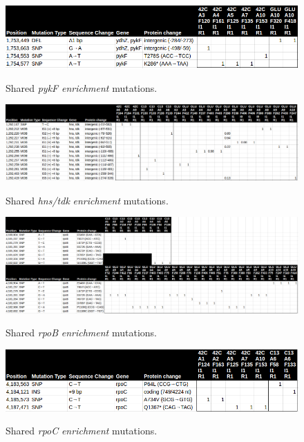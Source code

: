 \documentclass[12pt,final,masters,chapterheads]{ucsd}  %
\begin{document}
\begin{figure}[h!]
  \caption{Shared \textit{pykF} \textit{enrichment} mutations.}
  \centering
  \includegraphics[width=\textwidth]{pykF_shared_enrich_mut.png}
  \label{fig:pykF_shared_enrich_mut}
\end{figure}

\begin{figure}[h!]
  \caption{Shared \textit{hns/tdk} \textit{enrichment} mutations.}
  \centering
  \includegraphics[width=\textwidth]{hns_tdk_shared_enrich_mut.png}
  \label{fig:hns_tdk_shared_enrich_mut}
\end{figure}

\begin{figure}[h!]
  \caption{Shared \textit{rpoB} \textit{enrichment} mutations.}
  \centering
  \includegraphics[width=\textwidth]{rpoB_shared_enrich_mut.png}
  \label{fig:rpoB_shared_enrich_mut}
\end{figure}

\begin{figure}[h!]
  \caption{Shared \textit{rpoC} \textit{enrichment} mutations.}
  \centering
  \includegraphics[width=\textwidth]{rpoC_shared_enrich_mut.png}
  \label{fig:rpoC_shared_enrich_mut}
\end{figure}
\end{document}

